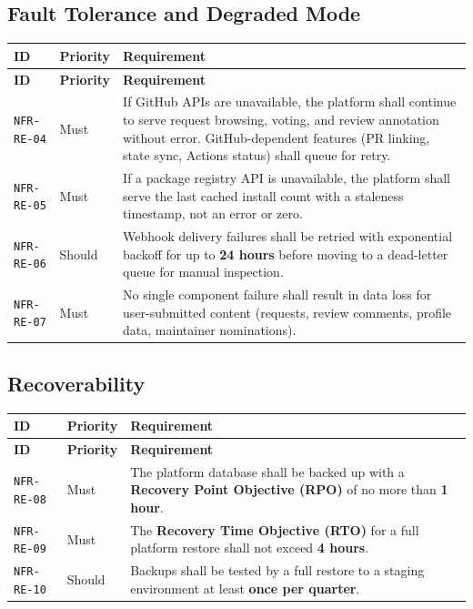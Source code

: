 \documentclass[12pt,a4paper]{article}
\begin{document}
\subsection{Fault Tolerance and Degraded Mode}
\begin{longtable}{L{2.2cm} L{1.8cm} L{9.3cm}}
  \color{white}\bfseries ID & \color{white}\bfseries Priority & \color{white}\bfseries Requirement \\
  \endfirsthead
  \color{white}\bfseries ID & \color{white}\bfseries Priority & \color{white}\bfseries Requirement \\
  \endhead\hline
  \texttt{NFR-RE-04} & Must   & If GitHub APIs are unavailable, the platform shall continue to serve request browsing, voting, and review annotation without error. GitHub-dependent features (PR linking, state sync, Actions status) shall queue for retry. \\
  \texttt{NFR-RE-05} & Must   & If a package registry API is unavailable, the platform shall serve the last cached install count with a staleness timestamp, not an error or zero. \\
  \texttt{NFR-RE-06} & Should & Webhook delivery failures shall be retried with exponential backoff for up to \textbf{24 hours} before moving to a dead-letter queue for manual inspection. \\
  \texttt{NFR-RE-07} & Must   & No single component failure shall result in data loss for user-submitted content (requests, review comments, profile data, maintainer nominations). \\
  \hline
\end{longtable}

\subsection{Recoverability}
\begin{longtable}{L{2.2cm} L{1.8cm} L{9.3cm}}
  \color{white}\bfseries ID & \color{white}\bfseries Priority & \color{white}\bfseries Requirement \\
  \endfirsthead
  \color{white}\bfseries ID & \color{white}\bfseries Priority & \color{white}\bfseries Requirement \\
  \endhead\hline
  \texttt{NFR-RE-08} & Must   & The platform database shall be backed up with a \textbf{Recovery Point Objective (RPO)} of no more than \textbf{1 hour}. \\
  \texttt{NFR-RE-09} & Must   & The \textbf{Recovery Time Objective (RTO)} for a full platform restore shall not exceed \textbf{4 hours}. \\
  \texttt{NFR-RE-10} & Should & Backups shall be tested by a full restore to a staging environment at least \textbf{once per quarter}. \\
  \hline
\end{longtable}
\end{document}
